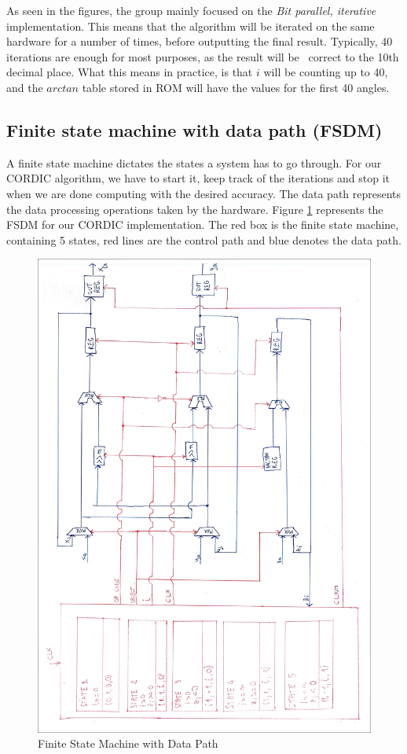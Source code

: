 \documentclass[12pt, a4paper,oneside]{article}
\begin{document}
As seen in the figures, the group mainly focused on the \textit{Bit parallel,
iterative} implementation. This means that the algorithm will be iterated on 
the same hardware for a number of times, before outputting the final result.
Typically, 40 iterations are enough for most purposes, as the result will be \
correct to the 10th decimal place\cite{cordic2}. What this means in practice,
is that $i$ will be counting up to 40, and the $arctan$ table stored in ROM
will have the values for the first 40 angles.

\subsection{Finite state machine with data path (FSDM)}\label{ssec:fsdm}
A finite state machine dictates the states a system has to go through.
For our CORDIC algorithm, we have to start it, keep track of the iterations
and stop it when we are done computing with the desired accuracy. 
The data path represents the data processing operations taken by the hardware.
Figure \ref{fig:finite_state_machine} represents the FSDM for our CORDIC
implementation. The red box is the finite state machine, containing 5 states,
red lines are the control path and blue denotes the data path.

\begin{figure}[H]
	\centering
	\includegraphics[width = \linewidth]{finite_state_machine_edit.jpg}
	\caption{Finite State Machine with Data Path}
	\label{fig:finite_state_machine}
\end{figure}
\end{document}
